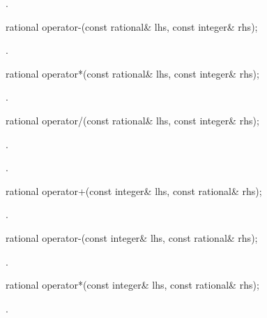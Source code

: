 \begin{itemdescr}
\returns {}.
\end{itemdescr}

\begin{itemdecl}
rational operator-(const rational& lhs, const integer& rhs);
\end{itemdecl}

\begin{itemdescr}
\returns {}.
\end{itemdescr}

\begin{itemdecl}
rational operator*(const rational& lhs, const integer& rhs);
\end{itemdecl}

\begin{itemdescr}
\returns {}.
\end{itemdescr}

\begin{itemdecl}
rational operator/(const rational& lhs, const integer& rhs);
\end{itemdecl}

\begin{itemdescr}
\requires {}.

\returns {}.
\end{itemdescr}

\begin{itemdecl}
rational operator+(const integer& lhs, const rational& rhs);
\end{itemdecl}

\begin{itemdescr}
\returns {}.
\end{itemdescr}

\begin{itemdecl}
rational operator-(const integer& lhs, const rational& rhs);
\end{itemdecl}

\begin{itemdescr}
\returns {}.
\end{itemdescr}

\begin{itemdecl}
rational operator*(const integer& lhs, const rational& rhs);
\end{itemdecl}

\begin{itemdescr}
\returns {}.
\end{itemdescr}

